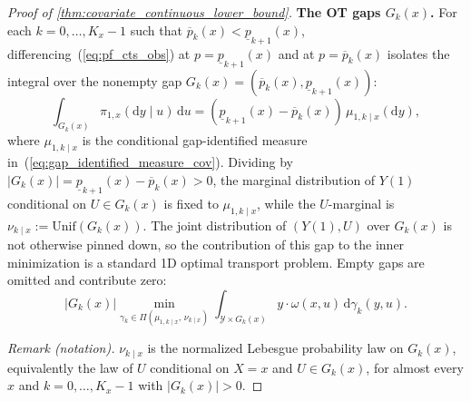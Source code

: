\begin{proof}[Proof of \cref{thm:covariate_continuous_lower_bound}]
\medskip
\noindent\textbf{The OT gaps $G_k(x)$.}
For each $k = 0,\dots,K_x-1$ such that $\overline p_k(x)<\underline p_{k+1}(x)$, differencing~(\ref{eq:pf_cts_obs}) at $p = \underline{p}_{k+1}(x)$ and at $p = \overline{p}_k(x)$ isolates the integral over the nonempty gap $G_k(x) = (\overline{p}_k(x), \underline{p}_{k+1}(x))$:
\begin{equation}\label{eq:pf_cts_gap_constraint}
    \int_{G_k(x)} \pi_{1,x}(\mathrm{d}y \mid u)\,\mathrm{d}u = (\underline{p}_{k+1}(x)-\overline{p}_k(x))\,\mu_{1,k\mid x}(\mathrm{d}y),
\end{equation}
where $\mu_{1,k\mid x}$ is the conditional gap-identified measure in~(\ref{eq:gap_identified_measure_cov}). Dividing by $|G_k(x)| = \underline{p}_{k+1}(x)-\overline{p}_k(x) > 0$, the marginal distribution of $Y(1)$ conditional on $U \in G_k(x)$ is fixed to $\mu_{1,k\mid x}$, while the $U$-marginal is $\nu_{k\mid x} := \mathrm{Unif}(G_k(x))$. The joint distribution of $(Y(1), U)$ over $G_k(x)$ is not otherwise pinned down, so the contribution of this gap to the inner minimization is a standard 1D optimal transport problem. Empty gaps are omitted and contribute zero:
\begin{equation}\label{eq:pf_cts_ot_sub}
    |G_k(x)|\min_{\gamma_k \in \Pi(\mu_{1,k\mid x},\, \nu_{k\mid x})} \int_{\mathcal{Y} \times G_k(x)} y \cdot \omega(x, u)\,\mathrm{d}\gamma_k(y, u).
\end{equation}

\noindent\textit{Remark (notation).} $\nu_{k\mid x}$ is the normalized Lebesgue probability law on $G_k(x)$, equivalently the law of $U$ conditional on $X=x$ and $U\in G_k(x)$, for almost every $x$ and $k=0,\ldots,K_x-1$ with $|G_k(x)|>0$.



\end{proof}
